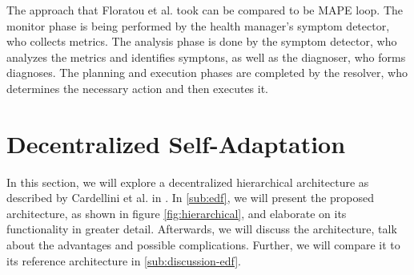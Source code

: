         \quad The approach that Floratou et al. took can be compared to be MAPE loop. The monitor phase is being performed by the health manager's symptom detector, who collects metrics.
        The analysis phase is done by the symptom detector, who analyzes the metrics and identifies symptons, as well as the diagnoser, who forms diagnoses.
        The planning and execution phases are completed by the resolver, who determines the necessary action and then executes it.

    \section{Decentralized Self-Adaptation}
    \label{sec:hierarchical}
    In this section, we will explore a decentralized hierarchical architecture as described by Cardellini et al. in \cite{cardellini}.
    In \ref{sub:edf}, we will present the proposed architecture, as shown in figure \ref{fig:hierarchical}, and elaborate on its functionality in greater detail.
    Afterwards, we will discuss the architecture, talk about the advantages and possible complications. Further, we will compare it to its reference architecture in \ref{sub:discussion-edf}.


